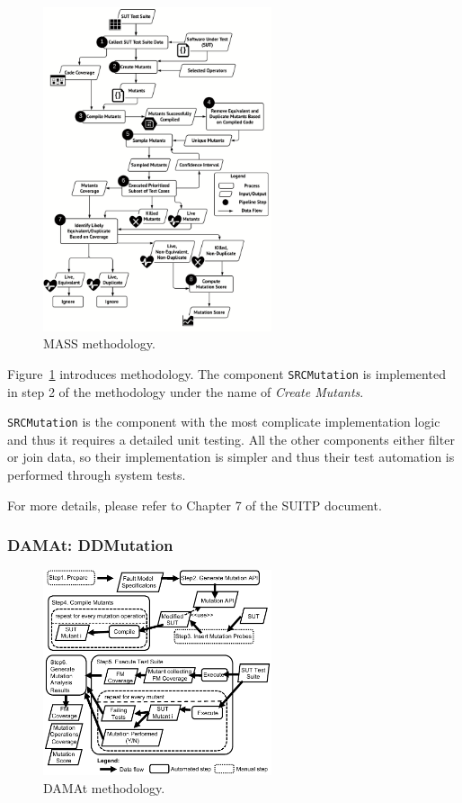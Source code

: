\begin{figure}[h]
  \centering
  \includegraphics[width=0.6\textwidth]{images/Approach.pdf}
      \caption{MASS methodology.}
      \label{fig:mass}
\end{figure}

Figure~\ref{fig:mass} introduces \MASS methodology. The component \texttt{SRCMutation} is implemented in step 2 of the methodology under the name of \emph{Create Mutants}.

\texttt{SRCMutation} is the component with the most complicate implementation logic and thus it requires a detailed unit testing. All the other components either filter or join data, so their implementation is simpler and thus their test automation is performed through system tests.

For more details, please refer to Chapter 7 of the SUITP document.

\clearpage
\subsubsection{DAMAt: DDMutation}

\begin{figure}[h]
  \centering
  \includegraphics[width=0.6\textwidth]{images/dataDrivenBufferProcess.pdf}
      \caption{DAMAt methodology.}
      \label{fig:damat}
\end{figure}


